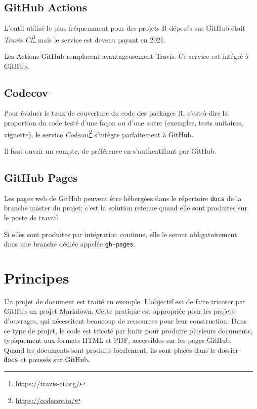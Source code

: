 \documentclass[
  12pt,
  french,
  a4paper,
  extrafontsizes,onecolumn,openright
  ]{memoir}
\newlength{\rf}
\begin{document}
\hypertarget{github-actions}{%
\subsection{GitHub Actions}\label{github-actions}}

L'outil utilisé le plus fréquemment pour des projets R déposés sur GitHub était \emph{Travis CI}\footnote{\url{https://travis-ci.org/}} mais le service est devenu payant en 2021.

Les Actions GitHub remplacent avantageusement Travis.
Ce service est intégré à GitHub.

\hypertarget{codecov}{%
\subsection{Codecov}\label{codecov}}

Pour évaluer le taux de couverture du code des packages R, c'est-à-dire la proportion du code testé d'une façon ou d'une autre (exemples, tests unitaires, vignette), le service \emph{Codecov}\footnote{\url{https://codecov.io/}} s'intègre parfaitement à GitHub.

Il faut ouvrir un compte, de préférence en s'authentifiant par GitHub.

\hypertarget{github-pages}{%
\subsection{GitHub Pages}\label{github-pages}}

Les pages web de GitHub peuvent être hébergées dans le répertoire \texttt{docs} de la branche master du projet: c'est la solution retenue quand elle sont produites sur le poste de travail.

Si elles sont produites par intégration continue, elle le seront obligatoirement dans une branche dédiée appelée \texttt{gh-pages}.

\hypertarget{principes}{%
\section{Principes}\label{principes}}

Un projet de document est traité en exemple.
L'objectif est de faire tricoter par GitHub un projet Markdown.
Cette pratique est appropriée pour les projets d'ouvrages, qui nécessitent beaucoup de ressources pour leur construction.
Dans ce type de projet, le code est tricoté par knitr pour produire plusieurs documents, typiquement aux formats HTML et PDF, accessibles sur les pages GitHub.
Quand les documents sont produits localement, ils sont placés dans le dossier \texttt{docs} et poussés sur GitHub.
\end{document}

